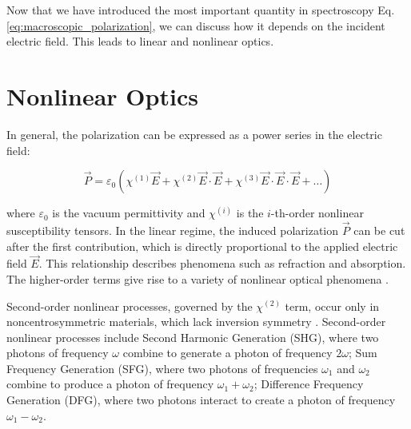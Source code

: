 \noindent
Now that we have introduced the most important quantity in spectroscopy Eq. \ref{eq:macroscopic_polarization}, we can discuss how it depends on the incident electric field. This leads to linear and nonlinear optics.

\section{Nonlinear Optics}
\label{sec:nonlinear_optics}


In general, the polarization can be expressed as a power series in the electric field:

\begin{equation}
	\vec{P} = \varepsilon_0 (\chi^{(1)} \vec{E} + \chi^{(2)} \vec{E} \cdot \vec{E} + \chi^{(3)} \vec{E} \cdot \vec{E} \cdot \vec{E} + \ldots)
	\label{eq:nonlinear_polarization}
\end{equation}

\noindent 
where $\varepsilon_0$ is the vacuum permittivity and $\chi^{(i)}$ is the $i$-th-order nonlinear susceptibility tensors. 
In the linear regime, the induced polarization $\vec{P}$ can be cut after the first contribution, which is directly proportional to the applied electric field $\vec{E}$.
This relationship describes phenomena such as refraction and absorption.
The higher-order terms give rise to a variety of nonlinear optical phenomena \cite{boyd2008contents}.

\noindent 
{}
Second-order nonlinear processes, governed by the $\chi^{(2)}$ term, occur only in noncentrosymmetric materials, which lack inversion symmetry \cite{rao2018overviewsecondthird,boyd2008chapter1nonlinear}.  Second-order nonlinear processes include Second Harmonic Generation (SHG), where two photons of frequency $\omega$ combine to generate a photon of frequency $2\omega$; Sum Frequency Generation (SFG), where two photons of frequencies $\omega_1$ and $\omega_2$ combine to produce a photon of frequency $\omega_1 + \omega_2$; Difference Frequency Generation (DFG), where two photons interact to create a photon of frequency $\omega_1 - \omega_2$.


